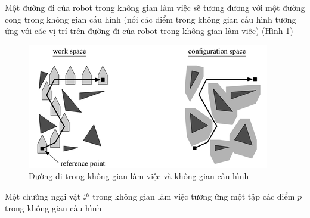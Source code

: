 \documentclass[a4paper,12pt]{report}
\begin{document}
\par Một đường đi của robot trong không gian làm việc sẽ tương đương với một đường cong trong không gian cấu hình (nối các điểm trong không gian cấu hình tương ứng với các vị trí trên đường đi của robot trong không gian làm việc) (Hình \ref{fig_path})
\begin{figure}[H]
\label{fig_path}
\centering
\includegraphics[scale=1]{path.png}
\caption{Đường đi trong không gian làm việc và không gian cấu hình}
\end{figure}
\par Một chướng ngại vật $\mathcal{P}$ trong không gian làm việc tương ứng một tập các điểm $p$ trong không gian cấu hình 


\begin{thebibliography}{9}

\end{thebibliography}
\end{document}
